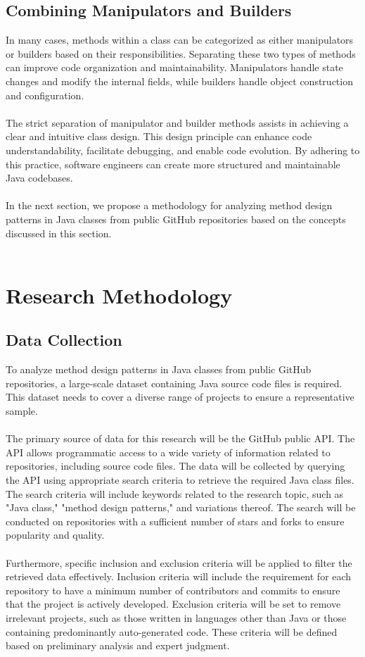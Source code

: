 \documentclass[draft]{article}
\begin{document}
\subsection{Combining Manipulators and Builders}
In many cases, methods within a class can be categorized as either manipulators or builders based on their responsibilities. Separating these two types of methods can improve code organization and maintainability. Manipulators handle state changes and modify the internal fields, while builders handle object construction and configuration.\\
~\\
The strict separation of manipulator and builder methods assists in achieving a clear and intuitive class design. This design principle can enhance code understandability, facilitate debugging, and enable code evolution. By adhering to this practice, software engineers can create more structured and maintainable Java codebases.\\
~\\
In the next section, we propose a methodology for analyzing method design patterns in Java classes from public GitHub repositories based on the concepts discussed in this section.\\
~\\

\newpage
\section{Research Methodology}
\subsection{Data Collection}
To analyze method design patterns in Java classes from public GitHub repositories, a large-scale dataset containing Java source code files is required. This dataset needs to cover a diverse range of projects to ensure a representative sample.\\
~\\
The primary source of data for this research will be the GitHub public API. The API allows programmatic access to a wide variety of information related to repositories, including source code files. The data will be collected by querying the API using appropriate search criteria to retrieve the required Java class files. The search criteria will include keywords related to the research topic, such as "{}Java class,"{} "{}method design patterns,"{} and variations thereof. The search will be conducted on repositories with a sufficient number of stars and forks to ensure popularity and quality.\\
~\\
Furthermore, specific inclusion and exclusion criteria will be applied to filter the retrieved data effectively. Inclusion criteria will include the requirement for each repository to have a minimum number of contributors and commits to ensure that the project is actively developed. Exclusion criteria will be set to remove irrelevant projects, such as those written in languages other than Java or those containing predominantly auto-generated code. These criteria will be defined based on preliminary analysis and expert judgment.
\end{document}
